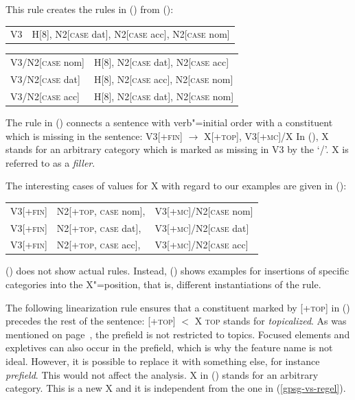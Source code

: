 \noindent
This rule creates the rules in () from ():
\ea
\begin{tabular}[t]{@{}l@{~$\to$~}l@{}}
V3  & H[8], N2[\textsc{case} dat], N2[\textsc{case} acc], N2[\textsc{case} nom] 
\end{tabular}
\z
\ea
\begin{tabular}[t]{@{}l@{~$\to$~}l@{}}
V3/N2[\textsc{case} nom] &  H[8], N2[\textsc{case} dat], N2[\textsc{case} acc]\\
V3/N2[\textsc{case} dat] &  H[8], N2[\textsc{case} acc], N2[\textsc{case} nom]\\
V3/N2[\textsc{case} acc] &  H[8], N2[\textsc{case} dat], N2[\textsc{case} nom]\\
\end{tabular}
\z

\noindent
The rule in () connects a sentence with verb"=initial order with a constituent which is missing in the sentence:
\ea
\label{gpsg-vs-regel}
V3[+\textsc{fin}] $\to$ X[+\textsc{top}], V3[+\textsc{mc}]/X
\z
In (), X stands for an arbitrary category which is marked as missing in V3 by the `/'. X is referred to as a 
\emph{filler}.

The interesting cases of values for X with regard to our examples are given in ():
\ea
\begin{tabular}[t]{@{}l@{~$\to$~}l@{~}l@{}}
V3[+\textsc{fin}] & N2[+\textsc{top}, \textsc{case} nom], & V3[+\textsc{mc}]/N2[\textsc{case} nom]\\
V3[+\textsc{fin}] & N2[+\textsc{top}, \textsc{case} dat], & V3[+\textsc{mc}]/N2[\textsc{case} dat]\\
V3[+\textsc{fin}] & N2[+\textsc{top}, \textsc{case} acc], & V3[+\textsc{mc}]/N2[\textsc{case} acc]\\
\end{tabular}
\z
() does not show actual rules. Instead, () shows examples for insertions of specific
categories into the X"=position, that is, different instantiations of the rule.

The following linearization rule ensures that a constituent marked by [+\textsc{top}] in () precedes the rest of the sentence:
\ea
{}[+\textsc{top}] $<$ X
\z
\largerpage
\textsc{top} stands for \emph{topicalized}. As was mentioned on
page~\pageref{Seite-Topikalisierung}, the prefield is not restricted to topics. Focused elements and expletives can
also occur in the prefield, which is why the feature name is not ideal. However, it is possible to replace
it with something else, for instance \emph{prefield}. This would not affect the analysis. X in ()
stands for an arbitrary category. This is a new X and it is independent from the one in (\ref{gpsg-vs-regel}). 

